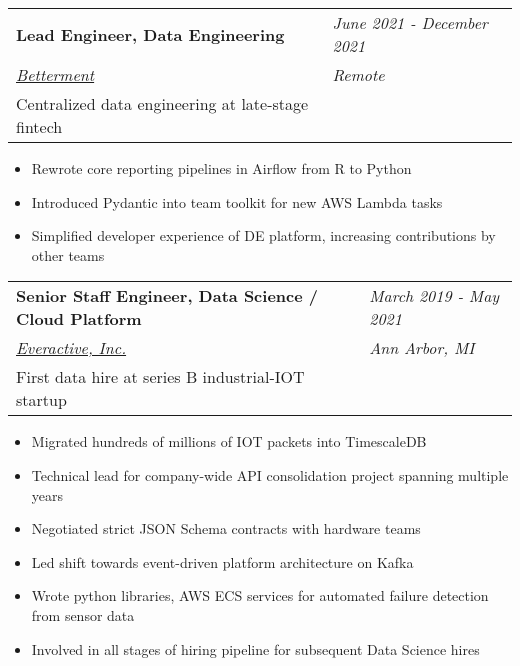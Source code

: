 \documentclass[margin,line]{res}
\begin{document}
\begin{resume}
  \begin{tabular}{p{4.6in} l}
    {\bf Lead Engineer, Data Engineering}         & \emph{June 2021 - December 2021} \\
    \href{https://betterment.com}{\it Betterment} & \emph{Remote}                    \\
    Centralized data engineering at late-stage fintech
  \end{tabular}
  \vspace{2pt}
  \begin{itemize}\itemsep -2pt
    \item Rewrote core reporting pipelines in Airflow from R to Python
    \item Introduced Pydantic into team toolkit for new AWS Lambda tasks
    \item Simplified developer experience of DE platform, increasing contributions by other teams
  \end{itemize}
  
  \begin{tabular}{p{4.6in} l}
    {\bf Senior Staff Engineer, Data Science / Cloud Platform} & \emph{March 2019 - May 2021} \\
    \href{https://everactive.com/}{\it Everactive, Inc.}       & \emph{Ann Arbor, MI}         \\
    First data hire at series B industrial-IOT startup
  \end{tabular}
  \vspace{2pt}
  \begin{itemize}\itemsep -2pt
    \item Migrated hundreds of millions of IOT packets into TimescaleDB
    \item Technical lead for company-wide API consolidation project spanning multiple years
    \item Negotiated strict JSON Schema contracts with hardware teams
    \item Led shift towards event-driven platform architecture on Kafka
    \item Wrote python libraries, AWS ECS services for automated failure detection from sensor data
    \item Involved in all stages of hiring pipeline for subsequent Data Science hires
  \end{itemize}
  

\end{resume}
\end{document}
